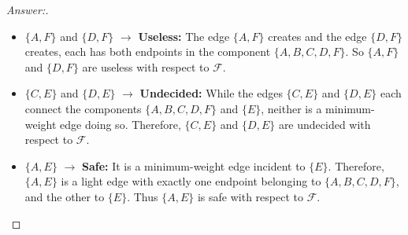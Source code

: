 \documentclass[11pt]{article}
\theoremstyle{definition}
\theoremstyle{definition}
\theoremstyle{definition}
\begin{document}
\begin{proof}[Answer:] \
\begin{itemize}
\item $\{A, F\}$ and $\{D, F\}$ $\to$ \textbf{Useless:} The edge $\{A, F\}$ creates and the edge $\{D, F\}$ creates, each has both  endpoints in the component $\{A, B, C, D, F\}$. So $\{A, F\}$ and $\{D, F\}$ are useless with respect to $\mathcal{F}$.

\item $\{C, E\}$ and $\{D, E\}$ $\to$ \textbf{Undecided:} While the edges $\{C, E\}$ and $\{D, E\}$ each connect the components $\{A, B, C, D, F\}$ and $\{E\}$, neither is a minimum-weight edge doing so. Therefore, $\{C, E\}$ and $\{D, E\}$ are undecided with respect to $\mathcal{F}$.

\item $\{A, E\}$ $\to$ \textbf{Safe:} It is a minimum-weight edge incident to $\{E\}$. Therefore, $\{A, E\}$ is a light edge with exactly one endpoint belonging to $\{A, B, C, D, F\}$, and the other to $\{E\}$. Thus $\{A, E\}$ is safe with respect to $\mathcal{F}$.
\end{itemize}
\end{proof}

\end{document}
